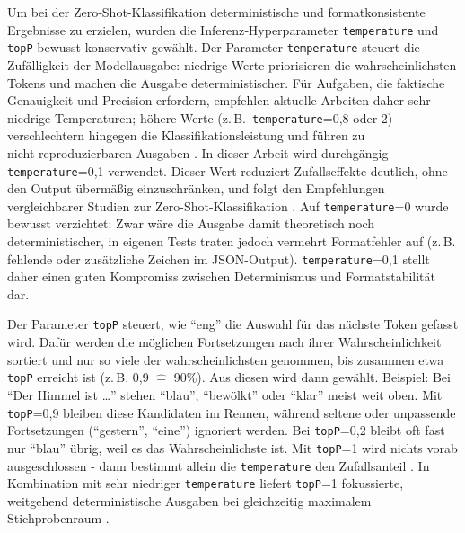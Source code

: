 Um bei der Zero‑Shot‑Klassifikation deterministische und formatkonsistente Ergebnisse zu erzielen, wurden die Inferenz‑Hyperparameter \texttt{temperature} und \texttt{topP} bewusst konservativ gewählt. Der Parameter \texttt{temperature} steuert die Zufälligkeit der Modellausgabe: niedrige Werte priorisieren die wahrscheinlichsten Tokens und machen die Ausgabe deterministischer. Für Aufgaben, die faktische Genauigkeit und Precision erfordern, empfehlen aktuelle Arbeiten daher sehr niedrige Temperaturen; höhere Werte (z.\,B.\ \texttt{temperature}=0{,}8 oder 2) verschlechtern hingegen die Klassifikationsleistung und führen zu nicht‑reproduzierbaren Ausgaben \cite{renze2024effect,mu2024navigating}. In dieser Arbeit wird durchgängig \texttt{temperature}=0{,}1 verwendet. Dieser Wert reduziert Zufallseffekte deutlich, ohne den Output übermäßig einzuschränken, und folgt den Empfehlungen vergleichbarer Studien zur Zero-Shot-Klassifikation \cite{mu2024navigating}. Auf \texttt{temperature}=0 wurde bewusst verzichtet: Zwar wäre die Ausgabe damit theoretisch noch deterministischer, in eigenen Tests traten jedoch vermehrt Formatfehler auf (z.\,B. fehlende oder zusätzliche Zeichen im JSON-Output). \texttt{temperature}=0{,}1 stellt daher einen guten Kompromiss zwischen Determinismus und Formatstabilität dar.

Der Parameter \texttt{topP} steuert, wie \enquote{eng} die Auswahl für das nächste Token gefasst wird. Dafür werden die möglichen Fortsetzungen nach ihrer Wahrscheinlichkeit sortiert und nur so viele der wahrscheinlichsten genommen, bis zusammen etwa \texttt{topP} erreicht ist (z.\,B. 0{,}9 $\widehat{=}$ 90\%). Aus diesen wird dann gewählt. Beispiel: Bei \enquote{Der Himmel ist \dots} stehen \enquote{blau}, \enquote{bewölkt} oder \enquote{klar} meist weit oben. Mit \texttt{topP}=0{,}9 bleiben diese Kandidaten im Rennen, während seltene oder unpassende Fortsetzungen (\enquote{gestern}, \enquote{eine}) ignoriert werden. Bei \texttt{topP}=0{,}2 bleibt oft fast nur \enquote{blau} übrig, weil es das Wahrscheinlichste ist. Mit \texttt{topP}=1 wird nichts vorab ausgeschlossen - dann bestimmt allein die \texttt{temperature} den Zufallsanteil \cite{renze2024effect}. In Kombination mit sehr niedriger \texttt{temperature} liefert \texttt{topP}=1 fokussierte, weitgehend deterministische Ausgaben bei gleichzeitig maximalem Stichprobenraum \cite{mu2024navigating}.